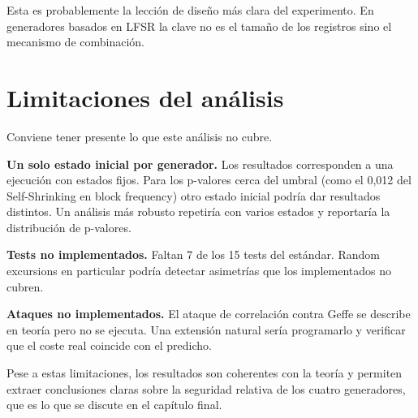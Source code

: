Esta es probablemente la lección de diseño más clara del experimento.
En generadores basados en LFSR la clave no es el tamaño de los registros sino el mecanismo de combinación.

\section{Limitaciones del análisis}

Conviene tener presente lo que este análisis no cubre.

\textbf{Un solo estado inicial por generador.} Los resultados corresponden a una ejecución
con estados fijos. Para los p-valores cerca del umbral (como el 0,012 del Self-Shrinking en block frequency)
otro estado inicial podría dar resultados distintos. Un análisis más robusto repetiría con varios estados
y reportaría la distribución de p-valores.

\textbf{Tests no implementados.} Faltan 7 de los 15 tests del estándar.
Random excursions en particular podría detectar asimetrías que los implementados no cubren.

\textbf{Ataques no implementados.} El ataque de correlación contra Geffe se describe en teoría
pero no se ejecuta. Una extensión natural sería programarlo y verificar
que el coste real coincide con el predicho.

Pese a estas limitaciones, los resultados son coherentes con la teoría y permiten extraer conclusiones claras sobre la seguridad relativa de los cuatro generadores,
que es lo que se discute en el capítulo final.
